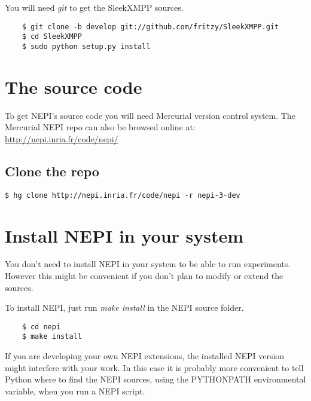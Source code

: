 You will need \textit{git} to get the SleekXMPP sources.

\begingroup
    \fontsize{10pt}{12pt}\selectfont

\begin{verbatim}
    $ git clone -b develop git://github.com/fritzy/SleekXMPP.git
    $ cd SleekXMPP
    $ sudo python setup.py install
\end{verbatim}

\endgroup

\section{The source code}

To get NEPI's source code you will need Mercurial version 
control system. The Mercurial NEPI repo can also be browsed online at: \\

\url{http://nepi.inria.fr/code/nepi/} 

\subsection{Clone the repo}

\begingroup
    \fontsize{10pt}{12pt}\selectfont

\begin{verbatim}
$ hg clone http://nepi.inria.fr/code/nepi -r nepi-3-dev
\end{verbatim}

\endgroup

\section{Install NEPI in your system}

You don't need to install NEPI in your system to be able to run 
experiments. However this might be convenient if you don't 
plan to modify or extend the sources.

To install NEPI, just run \emph{make install} in the NEPI source
folder.

\begingroup
    \fontsize{10pt}{12pt}\selectfont

\begin{verbatim}
    $ cd nepi
    $ make install 
\end{verbatim}

\endgroup

If you are developing your own NEPI extensions, the installed 
NEPI version might interfere with your work.
In this case it is probably more convenient to tell
Python where to find the NEPI sources, using the PYTHONPATH
environmental variable, when you run a NEPI script.

